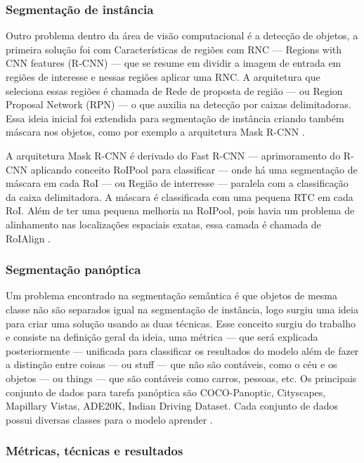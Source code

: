 \subsubsection*{Segmentação de instância}

Outro problema dentro da área de visão computacional é a detecção de objetos, a primeira solução foi com Características de regiões com RNC — Regions with CNN features (R-CNN) — que se resume em dividir a imagem de entrada em regiões de interesse e nessas regiões aplicar uma RNC. A arquitetura que seleciona essas regiões é chamada de Rede de proposta de região — ou Region Proposal Network (RPN) — o que auxilia na detecção por caixas delimitadoras. Essa ideia inicial foi extendida para segmentação de instância criando também máscara nos objetos, como por exemplo a arquitetura Mask R-CNN \cite{dp_semantic_segmantation, lapix}.

A arquitetura Mask R-CNN é derivado do Fast R-CNN — aprimoramento do R-CNN aplicando conceito RoIPool para classificar — onde há uma segmentação de máscara em cada RoI — ou Região de interresse — paralela com a classificação da caixa delimitadora. A máscara é classificada com uma pequena RTC em cada RoI. Além de ter uma pequena melhoria na RoIPool, pois havia um problema de alinhamento nas localizações espaciais exatas, essa camada é chamada de RoIAlign \cite{maskRCNN}.

\subsubsection*{Segmentação panóptica}

Um problema encontrado na segmentação semântica é que objetos de mesma classe não são separados igual na segmentação de instância, logo surgiu uma ideia para criar uma solução usando as duas técnicas. Esse conceito surgiu do trabalho  e consiste na definição geral da ideia, uma métrica — que será explicada posteriormente — unificada para classificar os resultados do modelo além de fazer a distinção entre coisas — ou stuff — que não são contáveis, como o céu e os objetos — ou things — que são contáveis como carros, pessoas, etc. 
Os principais conjunto de dados para tarefa panóptica são COCO-Panoptic, Cityscapes, Mapillary Vistas, ADE20K, Indian Driving Dataset. Cada conjunto de dados possui diversas classes para o modelo aprender \cite{v7labs2022panoptic}.

\subsubsection*{Métricas, técnicas e resultados}

